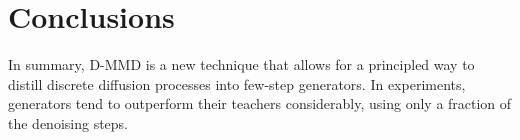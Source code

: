 \section{Conclusions}
In summary, D-MMD is a new technique that allows for a principled way to distill discrete diffusion processes into few-step generators. In experiments, generators tend to outperform their teachers considerably, using only a fraction of the denoising steps.
